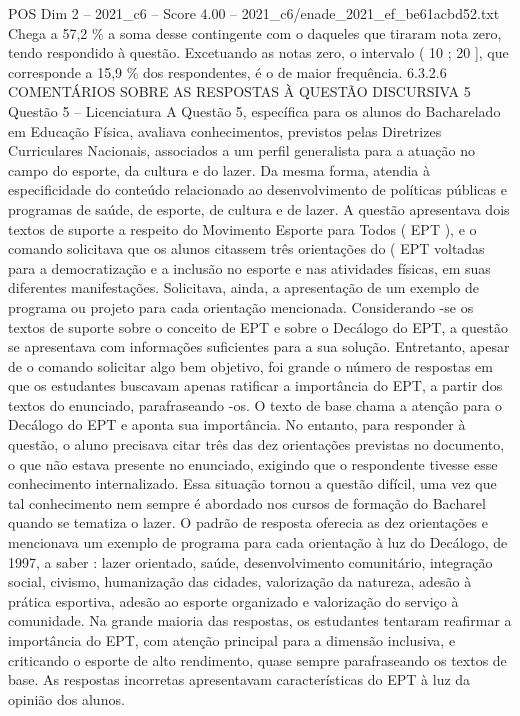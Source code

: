 \begin{textsample}{POS Dim 2 – 2021\_c6 – Score 4.00 – 2021\_c6/enade\_2021\_ef\_be61acbd52.txt}
Chega a 57,2 \% a soma desse contingente com o daqueles que tiraram nota zero, tendo respondido à questão.
Excetuando as notas zero, o intervalo ( 10 ; 20 ], que corresponde a 15,9 \% dos respondentes, é o de maior frequência. 6.3.2.6 COMENTÁRIOS SOBRE AS RESPOSTAS À QUESTÃO DISCURSIVA 5 Questão 5 – Licenciatura A Questão 5, específica para os alunos do Bacharelado em Educação Física, avaliava conhecimentos, previstos pelas Diretrizes Curriculares Nacionais, associados a um perfil generalista para a atuação no campo do esporte, da cultura e do lazer.
Da mesma forma, atendia à especificidade do conteúdo relacionado ao desenvolvimento de políticas públicas e programas de saúde, de esporte, de cultura e de lazer.
A questão apresentava dois textos de suporte a respeito do Movimento Esporte para Todos ( EPT ), e o comando solicitava que os alunos citassem três orientações do ( EPT voltadas para a democratização e a inclusão no esporte e nas atividades físicas, em suas diferentes manifestações.
Solicitava, ainda, a apresentação de um exemplo de programa ou projeto para cada orientação mencionada.
Considerando -se os textos de suporte sobre o conceito de EPT e sobre o Decálogo do EPT, a questão se apresentava com informações suficientes para a sua solução.
Entretanto, apesar de o comando solicitar algo bem objetivo, foi grande o número de respostas em que os estudantes buscavam apenas ratificar a importância do EPT, a partir dos textos do enunciado, parafraseando -os.
O texto de base chama a atenção para o Decálogo do EPT e aponta sua importância.
No entanto, para responder à questão, o aluno precisava citar três das dez orientações previstas no documento, o que não estava presente no enunciado, exigindo que o respondente tivesse esse conhecimento internalizado.
Essa situação tornou a questão difícil, uma vez que tal conhecimento nem sempre é abordado nos cursos de formação do Bacharel quando se tematiza o lazer.
O padrão de resposta oferecia as dez orientações e mencionava um exemplo de programa para cada orientação à luz do Decálogo, de 1997, a saber : lazer orientado, saúde, desenvolvimento comunitário, integração social, civismo, humanização das cidades, valorização da natureza, adesão à prática esportiva, adesão ao esporte organizado e valorização do serviço à comunidade.
Na grande maioria das respostas, os estudantes tentaram reafirmar a importância do EPT, com atenção principal para a dimensão inclusiva, e criticando o esporte de alto rendimento, quase sempre parafraseando os textos de base.
As respostas incorretas apresentavam características do EPT à luz da opinião dos alunos.

\end{textsample}
